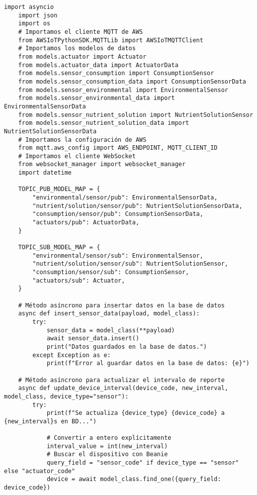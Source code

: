
\begin{lstlisting}[label=cod:mqtt_connection,caption=Definición de Clase para cliente MQTT., language=PythonUTF8]
    import asyncio
    import json
    import os
    # Importamos el cliente MQTT de AWS
    from AWSIoTPythonSDK.MQTTLib import AWSIoTMQTTClient
    # Importamos los modelos de datos
    from models.actuator import Actuator
    from models.actuator_data import ActuatorData
    from models.sensor_consumption import ConsumptionSensor
    from models.sensor_consumption_data import ConsumptionSensorData
    from models.sensor_environmental import EnvironmentalSensor
    from models.sensor_environmental_data import EnvironmentalSensorData
    from models.sensor_nutrient_solution import NutrientSolutionSensor
    from models.sensor_nutrient_solution_data import NutrientSolutionSensorData
    # Importamos la configuración de AWS
    from mqtt.aws_config import AWS_ENDPOINT, MQTT_CLIENT_ID
    # Importamos el cliente WebSocket
    from websocket_manager import websocket_manager
    import datetime

    TOPIC_PUB_MODEL_MAP = {
        "environmental/sensor/pub": EnvironmentalSensorData,
        "nutrient/solution/sensor/pub": NutrientSolutionSensorData,
        "consumption/sensor/pub": ConsumptionSensorData,
        "actuators/pub": ActuatorData,
    }

    TOPIC_SUB_MODEL_MAP = {
        "environmental/sensor/sub": EnvironmentalSensor,
        "nutrient/solution/sensor/sub": NutrientSolutionSensor,
        "consumption/sensor/sub": ConsumptionSensor,
        "actuators/sub": Actuator,
    }

    # Método asíncrono para insertar datos en la base de datos
    async def insert_sensor_data(payload, model_class):
        try:
            sensor_data = model_class(**payload)
            await sensor_data.insert()
            print("Datos guardados en la base de datos.")
        except Exception as e:
            print(f"Error al guardar datos en la base de datos: {e}")

    # Método asíncrono para actualizar el intervalo de reporte
    async def update_device_interval(device_code, new_interval, model_class, device_type="sensor"):
        try:
            print(f"Se actualiza {device_type} {device_code} a {new_interval}s en BD...")
            
            # Convertir a entero explícitamente
            interval_value = int(new_interval)
            # Buscar el dispositivo con Beanie
            query_field = "sensor_code" if device_type == "sensor" else "actuator_code"
            device = await model_class.find_one({query_field: device_code})
            

\end{lstlisting}
